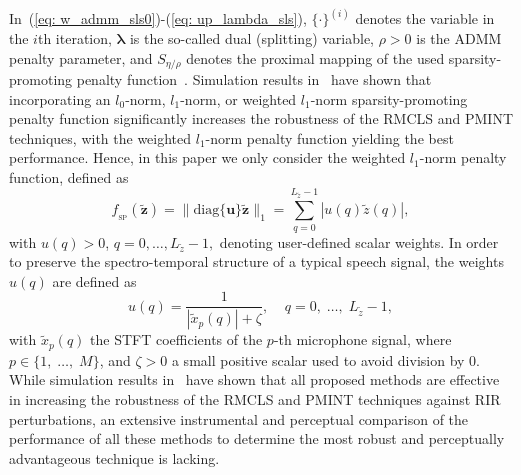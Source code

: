 \documentclass[fleqn]{aes2e}
\begin{document}
In~(\ref{eq: w_admm_sls0})-(\ref{eq: up_lambda_sls}), $\{\cdot\}^{(i)}$ denotes the variable in the $i$th iteration, $\bm{\lambda}$ is the so-called dual (splitting) variable, $\rho>0$ is the ADMM penalty parameter, and $S_{\eta/\rho}$ denotes the proximal mapping of the used sparsity-promoting penalty function~\cite{parikh2014proximal}.
Simulation results in~\cite{Kodrasi_ITASLP_2016b} have shown that incorporating an $l_0$-norm, $l_1$-norm, or weighted $l_1$-norm sparsity-promoting penalty function significantly increases the robustness of the RMCLS and PMINT techniques, with the weighted $l_1$-norm penalty function yielding the best performance.
Hence, in this paper we only consider the weighted $l_1$-norm penalty function, defined as
\begin{equation}
f_{_{\text{SP}}}(\tilde{\mathbf{z}}) = \|{\text{diag}}\{\mathbf{u} \}\tilde{\mathbf{z}}\|_1 = \sum_{q = 0}^{L_{\tilde{z}}-1} |u(q) \tilde{z}(q)|,
\end{equation}
with $u(q) > 0$, $q = 0, \ldots, L_{\tilde{z}}-1,$ denoting user-defined scalar weights.
In order to preserve the spectro-temporal structure of a typical speech signal, the weights $u(q)$ are defined as~\cite{Kodrasi_ITASLP_2016b}
\begin{equation}
\label{eq: weights}
u(q) = \frac{1}{|\tilde{x}_p(q)| + \zeta}, \; \; \; \; q = 0, \; \ldots, \; L_{\tilde{z}}-1,
\end{equation}
with $\tilde{x}_p(q)$ the STFT coefficients of the $p$-th microphone signal, where $p \in \{1, \; \ldots, \; M \}$, and $\zeta > 0$ a small positive scalar used to avoid division by $0$.
\vskip 2pt
While simulation results in~\cite{Kodrasi_EUSIPCO_2012, Kodrasi_ITASLP_2013,Kodrasi_ICASSP_2016, Kodrasi_ITASLP_2016b} have shown that all proposed methods are effective in increasing the robustness of the RMCLS and PMINT techniques against RIR perturbations, an extensive instrumental and perceptual comparison of the performance of all these methods to determine the most robust and perceptually advantageous technique is lacking.
\end{document}

